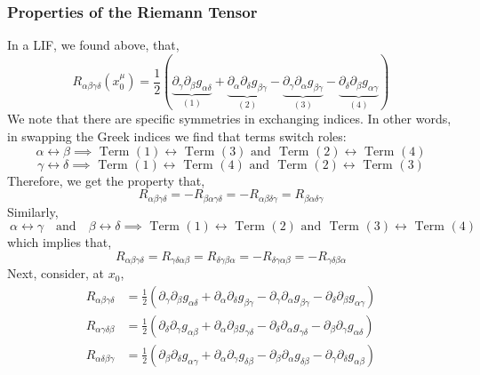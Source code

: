 \documentclass[11pt, a4paper]{article}
\begin{document}
\subsubsection{Properties of the Riemann Tensor}
In a LIF, we found above, that,  
\[R_{\alpha\beta\gamma\delta} (x^\mu_0) = \frac{1}{2}\left(\underbrace{\partial_\gamma\partial_\beta g_{\alpha\delta}}_{(1)} + \underbrace{\partial_\alpha\partial_\delta g_{\beta\gamma}}_{(2)}- \underbrace{ \partial_\gamma\partial_\alpha g_{\beta\gamma} }_{(3)}-\underbrace{ \partial_\delta\partial_\beta g_{\alpha\gamma}}_{(4)}\right)\]
We note that there are specific symmetries in exchanging indices. In other words, in swapping the Greek indices we find that terms switch roles:
\[\alpha \leftrightarrow \beta \implies \text{ Term $(1)$} \leftrightarrow \text{ Term $(3)$} \text{ and } \text{ Term $(2)$} \leftrightarrow \text{ Term $(4)$}\]
\[ \gamma\leftrightarrow \delta \implies \text{ Term $(1)$} \leftrightarrow \text{ Term $(4)$} \text{ and } \text{ Term $(2)$} \leftrightarrow \text{ Term $(3)$}\]
Therefore, we get the property that, 
\[R_{\alpha\beta\gamma\delta} = -R_{\beta\alpha \gamma\delta} =-R_{\alpha\beta\delta\gamma} = R_{\beta \alpha \delta \gamma}\]
Similarly, 
\[\ \alpha\leftrightarrow \gamma \quad \text{and} \quad \beta\leftrightarrow\delta \implies \text{ Term $(1)$} \leftrightarrow \text{ Term $(2)$} \text{ and } \text{ Term $(3)$} \leftrightarrow \text{ Term $(4)$}\]
which implies that, 
\[R_{\alpha\beta\gamma\delta} = R_{\gamma\delta\alpha\beta} = R_{\delta\gamma\beta \alpha} = -R_{\delta\gamma\alpha\beta} = - R_{\gamma\delta\beta\alpha}\]
Next, consider, at $x_0$,
\begin{align*}
R_{\alpha \beta \gamma \delta} & = \tfrac{1}{2}\left( \partial_\gamma\partial_\beta g_{\alpha\delta} + \partial_\alpha\partial_\delta g_{\beta\gamma} - \partial_\gamma\partial_\alpha g_{\beta\gamma} - \partial_\delta\partial_\beta g_{\alpha\gamma} \right)
\\
R_{\alpha \gamma \delta \beta} & = \tfrac{1}{2}\left( \partial_\delta \partial_\gamma g_{\alpha\beta} + \partial_\alpha\partial_\beta g_{\gamma\delta} - \partial_\delta\partial_\alpha g_{\gamma\delta} - \partial_\beta\partial_\gamma g_{\alpha\delta} \right)
\\
R_{\alpha \delta \beta \gamma} & = \tfrac{1}{2}\left( \partial_\beta\partial_\delta g_{\alpha\gamma} + \partial_\alpha\partial_\gamma g_{\delta\beta} - \partial_\beta\partial_\alpha g_{\delta\beta} - \partial_\gamma\partial_\delta g_{\alpha\beta} \right) 
\end{align*}
\end{document}

